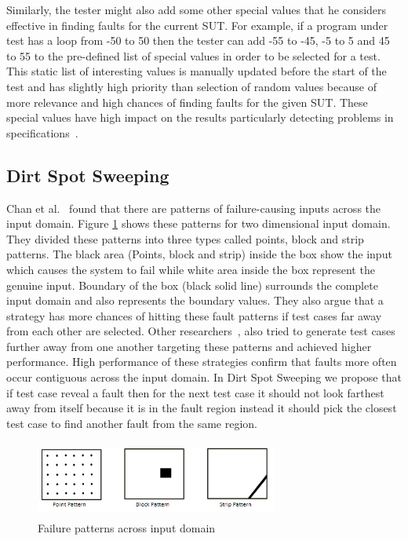 \documentclass{acm_proc_article-sp}
\begin{document}
Similarly, the tester might also add some other special values that he considers effective in finding faults for the current SUT. For example, if a program under test has a loop from -50 to 50 then the tester can add -55 to -45, -5 to 5 and 45 to 55 to the pre-defined list of special values in order to be selected for a test. This static list of interesting values is manually updated before the start of the test and has slightly high priority than selection of random values because of more relevance and high chances of finding faults for the given SUT. These special values have high impact on the results particularly detecting problems in specifications~\cite{Ciupa2008}.


\subsection{Dirt Spot Sweeping}
Chan et al.~\cite{Chan1996} found that there are patterns of failure-causing inputs across the input domain. Figure \ref{fig:patterns} shows these patterns for two dimensional input domain. They divided these patterns into three types called points, block and strip patterns. The black area (Points, block and strip) inside the box show the input which causes the system to fail while white area inside the box represent the genuine input. Boundary of the box (black solid line) surrounds the complete input domain and also represents the boundary values. They also argue that a strategy has more chances of hitting these fault patterns if test cases far away from each other are selected. Other researchers~\cite{Chan2002, Chen2003, Chen2005}, also tried to generate test cases further away from one another targeting these patterns and achieved higher performance. High performance of these strategies confirm that faults more often occur contiguous across the input domain. In Dirt Spot Sweeping we propose that if test case reveal a fault then for the next test case it should not look farthest away from itself because it is in the fault region instead it should pick the closest test case to find another fault from the same region.

\begin{figure}[ht]                                    
\centering
\includegraphics[width= 8cm,height=2.5cm]{ART_Patterns.png}
\caption{Failure patterns across input domain~\cite{Chen2008}}
\label{fig:patterns}
\end{figure}
\end{document}
